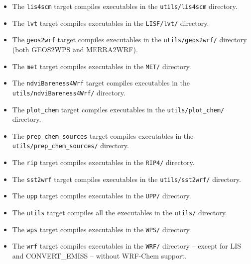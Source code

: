 \begin{itemize}
\begin{itemize}
  \item The \texttt{lis4scm} target compiles executables in the 
  \texttt{utils/lis4scm} directory. 

  \item The \texttt{lvt} target compiles executables in the \texttt{LISF/lvt/} 
    directory.

  \item The \texttt{geos2wrf} target compiles executables in the 
    \texttt{utils/geos2wrf/} directory (both GEOS2WPS and MERRA2WRF).

  \item The \texttt{met} target compiles executables in the \texttt{MET/} 
    directory.

  \item The \texttt{ndviBareness4Wrf} target compiles executables in the\\
    \texttt{utils/ndviBareness4Wrf/} directory.

  \item The \texttt{plot\_chem} target compiles executables in the
    \texttt{utils/plot\_chem/} directory.

  \item The \texttt{prep\_chem\_sources} target compiles executables in the\\
    \texttt{utils/prep\_chem\_sources/} directory.

  \item The \texttt{rip} target compiles executables in the \texttt{RIP4/}
    directory.

  \item The \texttt{sst2wrf} target compiles executables in the
    \texttt{utils/sst2wrf/} directory.

  \item The \texttt{upp} target compiles executables in the \texttt{UPP/}
    directory.

  \item The \texttt{utils} target compiles all the executables in the \texttt{utils/}
    directory.

  \item The \texttt{wps} target compiles executables in the \texttt{WPS/}
    directory.

  \item The \texttt{wrf} target compiles executables in the \texttt{WRF/}
    directory -- except for LIS and CONVERT\_EMISS -- without WRF-Chem support.

  \end{itemize}

\end{itemize}

